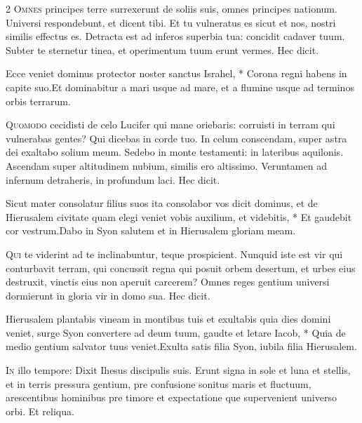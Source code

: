 \begin{multicols*}{2}
\lettrine[lines=2]{\zallmancaps \color{Blue} O}{mnes} principes terre surrexerunt de soliis suis, omnes principes nationum. Universi respondebunt, et dicent tibi. Et tu vulneratus es sicut et nos, nostri similis effectus es. Detracta est ad inferos superbia tua: concidit cadaver tuum. Subter te sternetur tinea, et operimentum tuum erunt vermes. Hec dicit.
\begin{responsory}
{Ecce veniet dominus protector noster sanctus Israhel, * Corona regni habens in capite suo.}{Et dominabitur a mari usque ad mare, et a flumine usque ad terminos orbis terrarum.}
\end{responsory}%
\lettrine[lines=2]{\zallmancaps \color{Red} Q}{uomodo} cecidisti de celo Lucifer qui mane oriebaris: corruisti in terram qui vulnerabas gentes? Qui dicebas in corde tuo. In celum conscendam, super astra dei exaltabo solium meum. Sedebo in monte testamenti: in lateribus aquilonis. Ascendam super altitudinem nubium, similis ero altissimo. Veruntamen ad infernum detraheris, in profundum laci. Hec dicit.
\begin{responsory}
{Sicut mater consolatur filius suos ita consolabor vos dicit dominus, et de Hierusalem civitate quam elegi veniet vobis auxilium, et videbitis, * Et gaudebit cor vestrum.}{Dabo in Syon salutem et in Hierusalem gloriam meam.}
\end{responsory}%
\lettrine[lines=2]{\zallmancaps \color{Blue} Q}{ui} te viderint ad te inclinabuntur, teque prospicient. Nunquid iste est vir qui conturbavit terram, qui concussit regna qui posuit orbem desertum, et urbes eius destruxit, vinctis eius non aperuit carcerem? Omnes reges gentium universi dormierunt in gloria vir in domo sua. Hec dicit.
\begin{responsory-doxology}
{Hierusalem plantabis vineam in montibus tuis et exultabis quia dies domini veniet, surge Syon convertere ad deum tuum, gaudte et letare Iacob, * Quia de medio gentium salvator tuus veniet.}{Exulta satis filia Syon, iubila filia Hierusalem.}
\end{responsory-doxology}%
\lettrine[lines=2]{\zallmancaps \color{Red} I}{n} illo tempore: Dixit Ihesus discipulis suis. Erunt signa in sole et luna et stellis, et in terris pressura gentium, pre confusione sonitus maris et fluctuum, arescentibus hominibus pre timore et expectatione que supervenient universo orbi. Et reliqua.

\end{multicols*}
